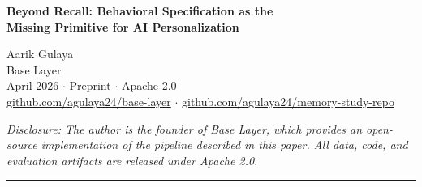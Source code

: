 \documentclass[11pt,a4paper]{article}
\begin{document}
\begin{center}
{\LARGE\bfseries Beyond Recall: Behavioral Specification as the\\
Missing Primitive for AI Personalization}

\vspace{1em}
{\large Aarik Gulaya} \\
{\normalsize Base Layer} \\[0.5em]
{\small April 2026 \quad $\cdot$ \quad Preprint \quad $\cdot$ \quad Apache 2.0}\\[0.3em]
{\small \href{https://github.com/agulaya24/base-layer}{github.com/agulaya24/base-layer} \quad $\cdot$ \quad
\href{https://github.com/agulaya24/memory-study-repo}{github.com/agulaya24/memory-study-repo}}

\vspace{0.3em}
{\small\textit{Disclosure: The author is the founder of Base Layer, which provides an open-source
implementation of the pipeline described in this paper.
All data, code, and evaluation artifacts are released under Apache 2.0.}}
\end{center}

\vspace{1em}
\hrule
\vspace{1em}
\end{document}
